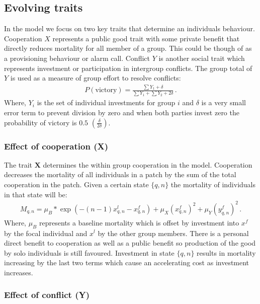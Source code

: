 \subsection{Evolving traits}
In the model we focus on two key traits that determine an individuals behaviour. Cooperation $X$ represents a public good trait with some private benefit that directly reduces mortality for all member of a group. This could be though of as a provisioning behaviour or alarm call. Conflict $Y$ is another social trait which represents investment or participation in intergroup conflicts. The group total of $Y$ is used as a measure of group effort to resolve conflicts: 
\begin{align}
    P(\text{victory}) = \frac{\sum Y_1 + \delta}{\sum Y_1 + \sum Y_2 + 2\delta}\,.
\end{align}
Where, $Y_i$ is the set of individual investments for group $i$ and $\delta$ is a very small error term to prevent division by zero and when both parties invest zero the probability of victory is $0.5$ $\left(\frac{\delta}{2\delta}\right)$. 

\subsubsection{Effect of cooperation (X)}

The trait $\mathbf{X}$ determines the within group cooperation in the model. Cooperation decreases the mortality of all individuals in a patch by the sum of the total cooperation in the patch. Given a certain state $\{q, n\}$ the mortality of individuals in that state will be:
\begin{align}
    M_{q,n} = \mu_B * \exp\left(-\left(n-1 \right)x^l_{q,n} - x^f_{q,n}\right) + \mu_X \left( x^f_{q,n} \right)^2 + \mu_Y \left( y^f_{q,n} \right)^2\,.
\end{align}
Where, $\mu_B$ represents a baseline mortality which is offset by investment into $x^f$ by the focal individual and $x^l$ by the other group members. There is a personal direct benefit to cooperation as well as a public benefit so production of the good by solo individuals is still favoured. Investment in state $\{q,n\}$ results in mortality increasing by the last two terms which cause an accelerating cost as investment increases. 

\subsubsection{Effect of conflict (Y)}

